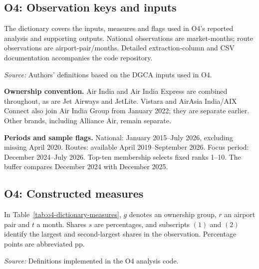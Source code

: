 \documentclass[12pt,a4paper]{article}
\begin{document}
\subsection{O4: Observation keys and inputs}
The dictionary covers the inputs, measures and flags used in O4's reported analysis and supporting outputs. National observations are market-months; route observations are airport-pair/months. Detailed extraction-column and CSV documentation accompanies the code repository.

\begin{minipage}{\linewidth}
\captionsetup{font=small,labelfont=bf,justification=raggedright,singlelinecheck=false,hypcap=false}
\label{tab:o4-dictionary-inputs}
\centering
{\footnotesize{}\setlength{\tabcolsep}{4pt}\par}
\vspace{4pt}
{\footnotesize{}\raggedright\textit{Source:} Authors' definitions based on the DGCA inputs used in O4.\par}
\end{minipage}

\textbf{Ownership convention.} Air India and Air India Express are combined throughout, as are Jet Airways and JetLite. Vistara and AirAsia India/AIX Connect also join Air India Group from January 2022; they are separate earlier. Other brands, including Alliance Air, remain separate.

\textbf{Periods and sample flags.} National: January 2015--July 2026, excluding missing April 2020. Routes: available April 2019--September 2026. Focus period: December 2024--July 2026. Top-ten membership selects fixed ranks 1--10. The buffer compares December 2024 with December 2025.

\clearpage
\subsection{O4: Constructed measures}
In Table~\ref{tab:o4-dictionary-measures}, $g$ denotes an ownership group, $r$ an airport pair and $t$ a month. Shares $s$ are percentages, and subscripts $(1)$ and $(2)$ identify the largest and second-largest shares in the observation. Percentage points are abbreviated pp.

\begin{minipage}{\linewidth}
\captionsetup{font=small,labelfont=bf,justification=raggedright,singlelinecheck=false,hypcap=false}
\label{tab:o4-dictionary-measures}
\centering
{\footnotesize{}\setlength{\tabcolsep}{4pt}\par}
\vspace{4pt}
{\footnotesize{}\raggedright\textit{Source:} Definitions implemented in the O4 analysis code.\par}
\end{minipage}
\end{document}

